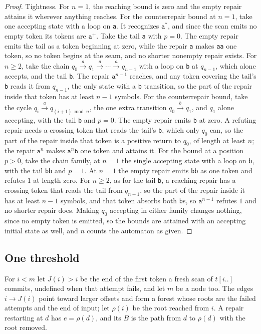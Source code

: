 \documentclass[11pt,a4paper]{article}
\theoremstyle{definition}
\theoremstyle{plain}
\theoremstyle{remark}
\newcommand{\code}[1]{\texttt{#1}}
\newcommand{\suffix}[2]{#1[#2..]}
\begin{document}
\begin{proof}
Tightness. For $n = 1$, the reaching bound is zero and the empty repair attains it wherever anything reaches. For the
counterrepair bound at $n = 1$, take one accepting state with a loop on \code{a}. It recognizes $\code{a}^{*}$, and
since the scan emits no empty token its tokens are $\code{a}^{+}$. Take the tail \code{a} with $p = 0$. The empty repair
emits the tail as a token beginning at zero, while the repair \code{a} makes \code{aa} one token, so no token begins at
the seam, and no shorter nonempty repair exists. For $n \ge 2$, take the chain
$q_0 \xrightarrow{a} q_1 \xrightarrow{a} \cdots \xrightarrow{a} q_{n-1}$ with a loop on \code{b} at $q_{n-1}$, which
alone accepts, and the tail \code{b}. The repair $\code{a}^{n-1}$ reaches, and any token covering the tail's \code{b}
reads it from $q_{n-1}$, the only state with a \code{b} transition, so the part of the repair inside that token has at
least $n - 1$ symbols. For the counterrepair bound, take the cycle $q_i \xrightarrow{a} q_{(i+1) \bmod n}$, the one
extra transition $q_0 \xrightarrow{b} q_1$, and $q_1$ alone accepting, with the tail \code{b} and $p = 0$. The empty
repair emits \code{b} at zero. A refuting repair needs a crossing token that reads the tail's \code{b}, which only $q_0$
can, so the part of the repair inside that token is a positive return to $q_0$, of length at least $n$; the repair
$\code{a}^{n}$ makes $\code{a}^{n}\code{b}$ one token and attains it. For the bound at a position $p > 0$, take the
chain family, at $n = 1$ the single accepting state with a loop on \code{b}, with the tail \code{bb} and $p = 1$. At
$n = 1$ the empty repair emits \code{bb} as one token and refutes $1$ at length zero. For $n \ge 2$, as for the tail
\code{b}, a reaching repair has a crossing token that reads the tail from $q_{n-1}$, so the part of the repair inside it
has at least $n - 1$ symbols, and that token absorbs both \code{b}s, so $\code{a}^{n-1}$ refutes $1$ and no shorter
repair does. Making $q_0$ accepting in either family changes nothing, since no empty token is emitted, so the bounds are
attained with an accepting initial state as well, and $n$ counts the automaton as given.
\end{proof}

\subsection{One threshold}

For $i < m$ let $J(i) > i$ be the end of the first token a fresh scan of $\suffix{t}{i}$ commits, undefined when that
attempt fails, and let $m$ be a node too. The edges $i \to J(i)$ point toward larger offsets and form a forest whose
roots are the failed attempts and the end of input; let $\rho(i)$ be the root reached from $i$. A repair restarting at
$d$ has $e = \rho(d)$, and its $B$ is the path from $d$ to $\rho(d)$ with the root removed.
\end{document}
